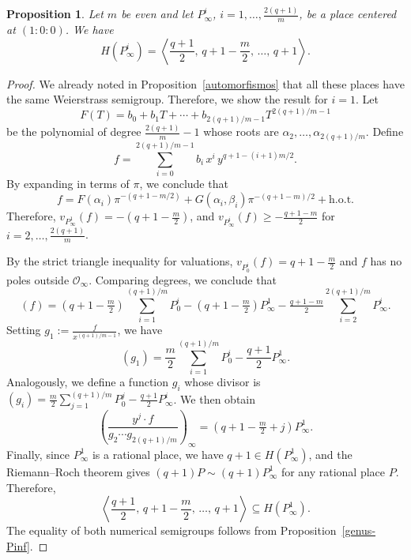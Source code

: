 \documentclass[12pt]{amsart}
\newtheorem{proposition}[theorem]{Proposition}
\theoremstyle{remark}
\theoremstyle{definition}
\newcommand{\coloneqq}{\mathrel{:=}}
\begin{document}
\begin{proposition}\label{prop:num-inf-even}
    Let $m$ be even and let $P_{\infty}^i$, $i = 1, \ldots, \frac{2(q+1)}{m}$,
    be a place centered at $(1:0:0)$. We have
    $$H(P_{\infty}^i) =
      \left\langle \frac{q+1}{2},\, q+1 - \frac{m}{2},\, \ldots,\, q+1
      \right\rangle.$$
\end{proposition}

\begin{proof}
    We already noted in Proposition~\ref{automorfismos} that all these places
    have the same Weierstrass semigroup. Therefore, we show the result for
    $i = 1$. Let
    $$F(T) = b_0 + b_1 T + \cdots + b_{2(q+1)/m-1} T^{2(q+1)/m-1}$$
    be the polynomial of degree $\frac{2(q+1)}{m}-1$ whose roots are
    $\alpha_2, \ldots, \alpha_{2(q+1)/m}$. Define
    $$f = \sum_{i=0}^{2(q+1)/m-1} b_i\, x^i\, y^{q+1-(i+1)m/2}.$$
    By expanding in terms of $\pi$, we conclude that
    $$f = F(\alpha_i)\pi^{-(q+1-m/2)} + G(\alpha_i,\beta_i)\pi^{-(q+1-m)/2}
        + \textrm{h.o.t.}$$
    Therefore, $v_{P_{\infty}^1}(f) = -(q+1-\frac{m}{2})$, and
    $v_{P_{\infty}^i}(f) \geq -\frac{q+1-m}{2}$ for
    $i = 2, \ldots, \frac{2(q+1)}{m}$.

    By the strict triangle inequality for valuations,
    $v_{P_0^i}(f) = q+1-\frac{m}{2}$ and $f$ has no poles outside
    $\mathcal{O}_{\infty}$. Comparing degrees, we conclude that
    $$(f) = \left(q+1-\tfrac{m}{2}\right)\sum_{i=1}^{(q+1)/m} P_0^i
           - \left(q+1-\tfrac{m}{2}\right) P_{\infty}^1
           - \tfrac{q+1-m}{2} \sum_{i=2}^{2(q+1)/m} P_{\infty}^i.$$
    Setting $g_1 \coloneqq \frac{f}{x^{(q+1)/m-1}}$, we have
    $$(g_1) = \frac{m}{2}\sum_{i=1}^{(q+1)/m} P_0^i
            - \frac{q+1}{2} P_{\infty}^1.$$
    Analogously, we define a function $g_i$ whose divisor is
    $(g_i) = \frac{m}{2}\sum_{j=1}^{(q+1)/m} P_0^j
            - \frac{q+1}{2} P_{\infty}^i$.
    We then obtain
    $$\left(\frac{y^j \cdot f}{g_2 \cdots g_{2(q+1)/m}}\right)_{\infty}
      = \left(q+1-\tfrac{m}{2}+j\right) P_{\infty}^1.$$
    Finally, since $P_{\infty}^1$ is a rational place, we have
    $q+1 \in H(P_{\infty}^1)$, and the Riemann--Roch theorem gives
    $(q+1)P \sim (q+1)P_{\infty}^1$ for any rational place $P$. Therefore,
    $$\left\langle \frac{q+1}{2},\, q+1 - \frac{m}{2},\, \ldots,\, q+1
      \right\rangle \subseteq H(P_{\infty}^1).$$
    The equality of both numerical semigroups follows from
    Proposition~\ref{genus-Pinf}.
\end{proof}
\end{document}

